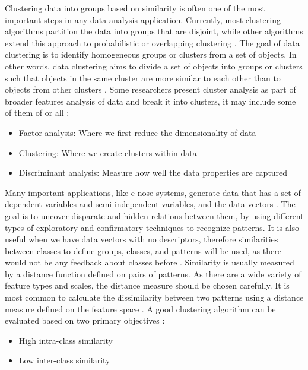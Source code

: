 \documentclass[letterpaper, 10 pt, conference]{ieeeconf}  %
\begin{document}
Clustering data into groups based on similarity is often one of the most important steps in any data-analysis application. Currently, most clustering algorithms partition the data into groups that are disjoint, while other algorithms extend this approach to probabilistic or overlapping clustering \cite{Ramasubramanian2017}. The goal of data clustering is to identify homogeneous groups or clusters from a set of objects. In other words, data clustering aims to divide a set of objects into groups or clusters such that objects in the same cluster are more similar to each other than to objects from other clusters \cite{Hastie2009}. Some researchers present cluster analysis as part of broader features analysis of data and break it into clusters, it may include some of them of or all \cite{Ramasubramanian2017}:
\begin{itemize}
	\item  Factor analysis: Where we first reduce the dimensionality of data
	\item Clustering: Where we create clusters within data
    \item Discriminant analysis: Measure how well the data properties are captured
\end{itemize}  
Many important applications, like e-nose systems, generate data that has a set of dependent variables and semi-independent variables, and the data vectors \cite{Scott2006}. The goal is to uncover disparate and hidden relations between them, by using different types of exploratory and confirmatory techniques to recognize patterns. It is also useful when we have data vectors with no descriptors, therefore similarities between classes to define groups, classes, and patterns will be used, as there would not be any feedback about classes before \cite{Hastie2009}. Similarity is usually measured by a distance function defined on pairs of patterns. As there are a wide variety of feature types and scales, the distance measure should be chosen carefully. It is most common to calculate the dissimilarity between two patterns using a distance measure defined on the feature space  \cite{Scott2006}. A good clustering algorithm can be evaluated based on two primary objectives \cite{Ramasubramanian2017}:
\begin{itemize}
	\item High intra-class similarity
	\item Low inter-class similarity 
\end{itemize}
\end{document}
